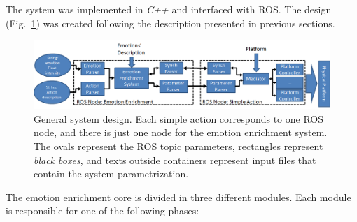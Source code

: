 The system was implemented in \textit{C++} and interfaced with ROS. The design (Fig.~\ref{fig:system_architecture}) was created following the description presented in previous sections. 
\begin{figure}
	\centering
	\includegraphics[width=1.0\textwidth]{Images/SystemArchitecture.png} 	
	\caption{General system design. Each simple action corresponds to one ROS node, and there is just one node for the emotion enrichment system. The ovals represent the ROS topic parameters, rectangles represent \textit{black boxes}, and texts outside containers represent input files that contain the system parametrization.}
	\label{fig:system_architecture}
\end{figure}
The emotion enrichment core is divided in three different modules. 
Each module is responsible for one of the following phases:
